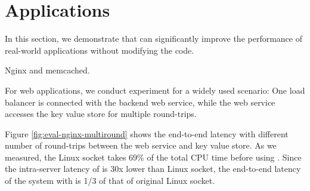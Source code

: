 \section{Applications}
\label{sec:application}

In this section, we demonstrate that \sys{} can significantly improve the performance of real-world applications without modifying the code.

Nginx and memcached.





For web applications, we conduct experiment for a widely used scenario: One load balancer is connected with the backend web service, while the web service accesses the key value store for multiple round-trips.

Figure \ref{fig:eval-nginx-multiround} shows the end-to-end latency with different number of round-trips between the web service and key value store. As we measured, the Linux socket takes 69\% of the total CPU time before using \libipc. Since the intra-server latency of \sys{} is 30x lower than Linux socket, the end-to-end latency of the system with \sys{}  is 1/3 of that of original Linux socket.






